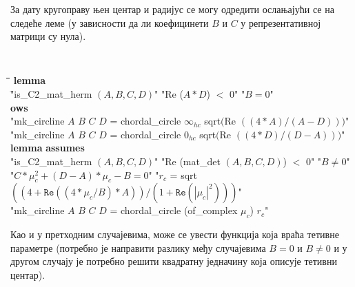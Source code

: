 \noindent За дату кругоправу њен центар и радијус се могу одредити
ослањајући се на следеће леме (у зависности да ли коефицинети $B$ и
$C$ у репрезентативној матрици су нула).
{\tt
  \begin{tabbing}
    \hspace{2mm}\=\hspace{5mm}\=\hspace{5mm}\=\hspace{5mm}\=\hspace{5mm}\=\kill
{\bf lemma}\\
 \="is\_C2\_mat\_herm $(A, B, C, D)$" "Re ($A*D$) $<$ $0$" "$B = 0$"\\
\={\bf ows}\\
\>\>"mk\_circline $A$ $B$ $C$ $D$ = chordal\_circle $\infty_{hc}$ sqrt$($Re $((4*A)/(A-D))$$)$"\\
\>\>"mk\_circline $A$ $B$ $C$ $D$ = chordal\_circle $0_{hc}$ sqrt$($Re $((4*D)/(D-A))$$)$"\\
{\bf lemma} {\bf assumes}\\
\> "is\_C2\_mat\_herm $(A, B, C, D)$" "Re (mat\_det $(A, B, C, D)$) $<$ $0$" "$B \neq 0$"\\
\> "$C * \mu_c^2  + (D - A) * \mu_c - B = 0$"  "$r_c$ = sqrt$((4 + \mathtt{Re}((4 * \mu_c/B) * A)) / (1 + \mathtt{Re} (|\mu_c|^2)))$"\\
 "mk\_circline $A$ $B$ $C$ $D$ = chordal\_circle (of\_complex $\mu_c$) $r_c$"
  \end{tabbing}
}

Као и у претходним случајевима, може се увести функција која враћа
тетивне параметре (потребно је направити разлику међу случајевима
$B=0$ и $B \neq 0$ и у другом случају је потребно решити квадратну
једначину која описује тетивни центар).

